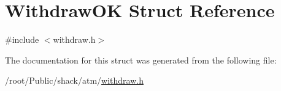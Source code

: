 \hypertarget{structWithdrawOK}{\section{Withdraw\-O\-K Struct Reference}
\label{structWithdrawOK}
}


{\ttfamily \#include $<$withdraw.\-h$>$}



The documentation for this struct was generated from the following file\-:\begin{DoxyCompactItemize}
\item 
/root/\-Public/shack/atm/\hyperlink{withdraw_8h}{withdraw.\-h}\end{DoxyCompactItemize}
